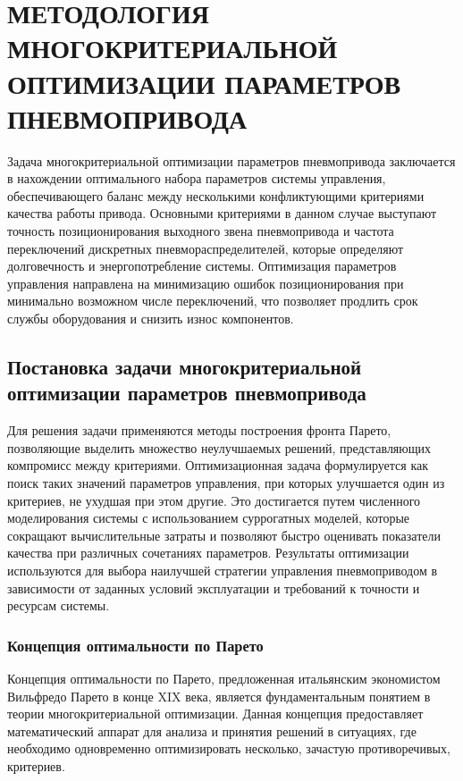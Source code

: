 \chapter{МЕТОДОЛОГИЯ МНОГОКРИТЕРИАЛЬНОЙ ОПТИМИЗАЦИИ ПАРАМЕТРОВ ПНЕВМОПРИВОДА}\label{ch:ch4}

Задача многокритериальной оптимизации параметров пневмопривода
заключается в нахождении оптимального набора параметров системы
управления, обеспечивающего баланс между несколькими конфликтующими
критериями качества работы привода. Основными критериями в данном случае
выступают точность позиционирования выходного звена пневмопривода и
частота переключений дискретных пневмораспределителей, которые определяют
долговечность и энергопотребление системы. Оптимизация параметров управления
направлена на минимизацию ошибок позиционирования при минимально возможном числе
переключений, что позволяет продлить срок службы оборудования и снизить износ компонентов.

\section{Постановка задачи многокритериальной оптимизации параметров пневмопривода}\label{ch:ch4/sec1}

Для решения задачи применяются методы построения фронта Парето,
позволяющие выделить множество неулучшаемых решений, представляющих
компромисс между критериями. Оптимизационная задача формулируется как
поиск таких значений параметров управления, при которых улучшается
один из критериев, не ухудшая при этом другие. Это достигается путем
численного моделирования системы с использованием суррогатных моделей,
которые сокращают вычислительные затраты и позволяют быстро оценивать
показатели качества при различных сочетаниях параметров. Результаты
оптимизации используются для выбора наилучшей стратегии управления
пневмоприводом в зависимости от заданных условий эксплуатации и
требований к точности и ресурсам системы.

\subsection{Концепция оптимальности по Парето}\label{ch:ch4/sec1/subsec1}

Концепция оптимальности по Парето, предложенная итальянским экономистом
Вильфредо Парето \cite*{pareto1896cours} в конце XIX века, является фундаментальным понятием в теории
многокритериальной оптимизации. Данная концепция предоставляет математический аппарат для
анализа и принятия решений \cite*{miettinen1999nonlinear} в ситуациях, где необходимо одновременно оптимизировать несколько,
зачастую противоречивых, критериев.

